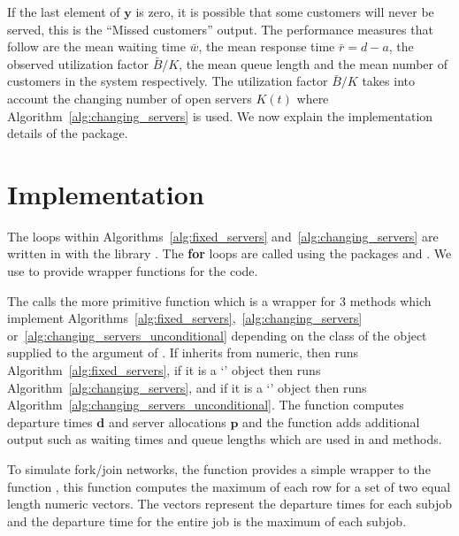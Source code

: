 \documentclass[article]{jss}
\begin{document}
%
If the last element of $\mathbf{y}$ is zero, it is possible that some
customers will never be served, this is the ``Missed customers''
output. The performance measures that follow are the mean waiting time
$\bar{w}$, the mean response time $\bar{r} = d - a$, the observed
utilization factor $\bar{B}/K$, the mean queue length and the mean
number of customers in the system respectively. The utilization factor
$\bar{B}/K$ takes into account the changing number of open servers
$K(t)$ where Algorithm~\ref{alg:changing_servers} is used. We now
explain the implementation details of the package.


\section{Implementation} \label{sec:Implementation}

The  loops within Algorithms~\ref{alg:fixed_servers}
and~\ref{alg:changing_servers} are written in  with the
 library \citep{sanderson2016armadillo}. The
 \textbf{for} loops are called using the 
packages  \citep{eddelbuettel2011rcpp} and
 \citep{eddelbuettel2014rcpparmadillo}. We use
 to provide wrapper functions for the  code.

The  calls the more primitive  function
which is a wrapper for 3 methods which implement
Algorithms~\ref{alg:fixed_servers},~\ref{alg:changing_servers}
or~\ref{alg:changing_servers_unconditional} depending on the class of
the object supplied to the  argument of
. If  inherits from numeric, then
 runs Algorithm~\ref{alg:fixed_servers}, if it is a
`' object then  runs
Algorithm~\ref{alg:changing_servers}, and if it is a
`' object then  runs
Algorithm~\ref{alg:changing_servers_unconditional}. The 
function computes departure times $\mathbf{d}$ and server allocations
$\mathbf{p}$ and the  function adds additional
output such as waiting times and queue lengths which are used in
 and  methods.

To simulate fork/join networks, the  function
 provides a simple wrapper to the  function
, this function computes the maximum of each row for a
set of two equal length numeric vectors. The vectors represent the
departure times for each subjob and the departure time for the entire
job is the maximum of each subjob.
\end{document}
